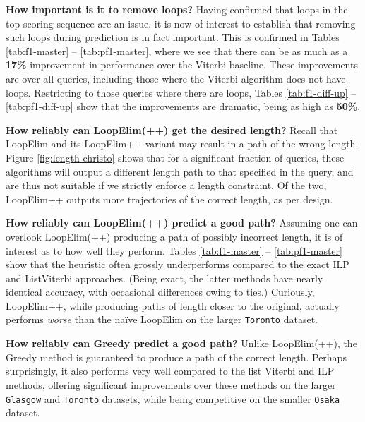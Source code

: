 \textbf{How important is it to remove loops?}
Having confirmed that loops in the top-scoring sequence are an issue,
it is now of interest to establish that removing such loops during prediction is in fact important.
This is confirmed in Tables \ref{tab:f1-master} -- \ref{tab:pf1-master},
where we see that there can be as much as a \textbf{17\%} improvement in performance over the {\sc Viterbi} baseline.
These improvements are over all queries, including those where the {\sc Viterbi} algorithm does not have loops.
Restricting to those queries where there are loops,
Tables \ref{tab:f1-diff-up} -- \ref{tab:pf1-diff-up}
show that the improvements are dramatic, being as high as \textbf{50\%}.

\textbf{How reliably can {\sc LoopElim(++)} get the desired length?}
Recall that
{\sc LoopElim} and its {\sc LoopElim++} variant
may result in a path of the wrong length.
Figure \ref{fig:length-christo} shows that for a significant fraction of queries,
these algorithms
will output a different length path to that specified in the query,
and are thus not suitable if we strictly enforce a length constraint.
Of the two, {\sc LoopElim++} outputs more trajectories of the correct length, as per design.

\textbf{How reliably can {\sc LoopElim(++)} predict a good path?}
Assuming one can overlook {\sc LoopElim(++)} producing a path of possibly incorrect length,
it is of interest as to how well
they perform.
Tables \ref{tab:f1-master} -- \ref{tab:pf1-master} show that the heuristic often
grossly underperforms compared to the exact {\sc ILP} and {\sc ListViterbi} approaches.
(Being exact, the latter methods have nearly identical accuracy, with occasional differences owing to ties.)
Curiously, {\sc LoopElim++}, while producing paths of length closer to the original, actually performs \emph{worse} than the na\"{i}ve {\sc LoopElim} on the larger {\tt Toronto} dataset.


\textbf{How reliably can {\sc Greedy} predict a good path?}
Unlike {\sc LoopElim(++)}, the {\sc Greedy} method is guaranteed to produce a path of the correct length.
Perhaps surprisingly, it also performs very well compared to the list Viterbi and ILP methods, 
offering significant improvements over these methods on the larger {\tt Glasgow} and {\tt Toronto} datasets,
while being competitive on the smaller {\tt Osaka} dataset.


